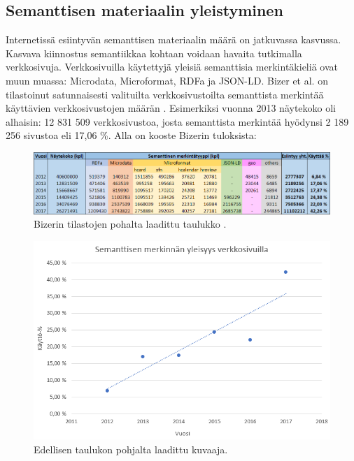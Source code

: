 \documentclass[finnish, 12pt, a4paper, elec, utf8, pdfa, online]{aaltothesis}
\begin{document}
{\subsection{Semanttisen materiaalin yleistyminen}

Internetissä esiintyvän semanttisen materiaalin määrä on jatkuvassa kasvussa. Kasvava kiinnostus semantiikkaa kohtaan voidaan havaita tutkimalla verkkosivuja. Verkkosivuilla käytettyjä yleisiä semanttisia merkintäkieliä ovat muun muassa: Microdata, Microformat, RDFa ja JSON-LD. Bizer et al. on tilastoinut satunnaisesti valituilta verkkosivustoilta semanttista merkintää käyttävien verkkosivustojen määrän \cite{rdfa_usage}. Esimerkiksi vuonna 2013 näytekoko oli alhaisin: 12 831 509 verkkosivustoa, josta semanttista merkintää hyödynsi 2 189 256 sivustoa eli 17,06 \%. Alla on kooste Bizerin tuloksista:

\begin{figure}[htb]
\centering
\includegraphics[width=15cm]{images/taulukko.png}
\caption{Bizerin tilastojen pohalta laadittu taulukko \cite{rdfa_usage}. \label{images/taulukko}}
\end{figure}

\begin{figure}[htb]
\centering
\includegraphics[width=13cm]{images/verkkosivut.png}
\caption{Edellisen taulukon pohjalta laadittu kuvaaja. \label{images/verkkosivut}}
\end{figure}
\clearpage

}
\end{document}
